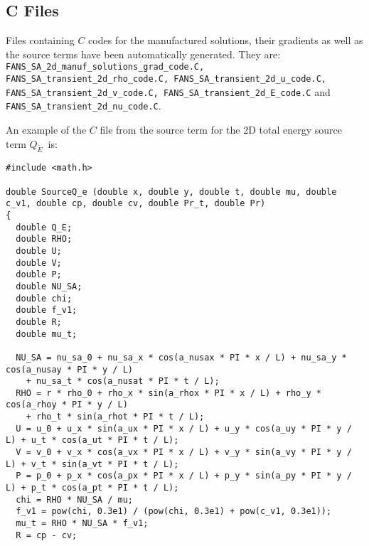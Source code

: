 \documentclass[10pt]{article}
\newcommand{\tE}{\tilde{E}}
\begin{document}
\subsection{C Files}

Files containing $C$ codes for the manufactured solutions, their gradients as well as the source terms have been automatically generated. They are: \texttt{FANS\_SA\_2d\_manuf\_solutions\_grad\_code.C, FANS\_SA\_transient\_2d\_rho\_code.C, FANS\_SA\_transient\_2d\_u\_code.C, FANS\_SA\_transient\_2d\_v\_code.C, FANS\_SA\_transient\_2d\_E\_code.C} and \\ \texttt{FANS\_SA\_transient\_2d\_nu\_code.C}.

An example of the $C$ file from the source term for the 2D total energy source term $Q_{\tE}$~is:

\begin{footnotesize}
\begin{verbatim}
#include <math.h>

double SourceQ_e (double x, double y, double t, double mu, double c_v1, double cp, double cv, double Pr_t, double Pr)
{
  double Q_E;
  double RHO;
  double U;
  double V;
  double P;
  double NU_SA;
  double chi;
  double f_v1;
  double R;
  double mu_t;

  NU_SA = nu_sa_0 + nu_sa_x * cos(a_nusax * PI * x / L) + nu_sa_y * cos(a_nusay * PI * y / L)
    + nu_sa_t * cos(a_nusat * PI * t / L);
  RHO = r * rho_0 + rho_x * sin(a_rhox * PI * x / L) + rho_y * cos(a_rhoy * PI * y / L)
    + rho_t * sin(a_rhot * PI * t / L);
  U = u_0 + u_x * sin(a_ux * PI * x / L) + u_y * cos(a_uy * PI * y / L) + u_t * cos(a_ut * PI * t / L);
  V = v_0 + v_x * cos(a_vx * PI * x / L) + v_y * sin(a_vy * PI * y / L) + v_t * sin(a_vt * PI * t / L);
  P = p_0 + p_x * cos(a_px * PI * x / L) + p_y * sin(a_py * PI * y / L) + p_t * cos(a_pt * PI * t / L);
  chi = RHO * NU_SA / mu;
  f_v1 = pow(chi, 0.3e1) / (pow(chi, 0.3e1) + pow(c_v1, 0.3e1));
  mu_t = RHO * NU_SA * f_v1;
  R = cp - cv;


\end{verbatim}
\end{footnotesize}
\end{document}
